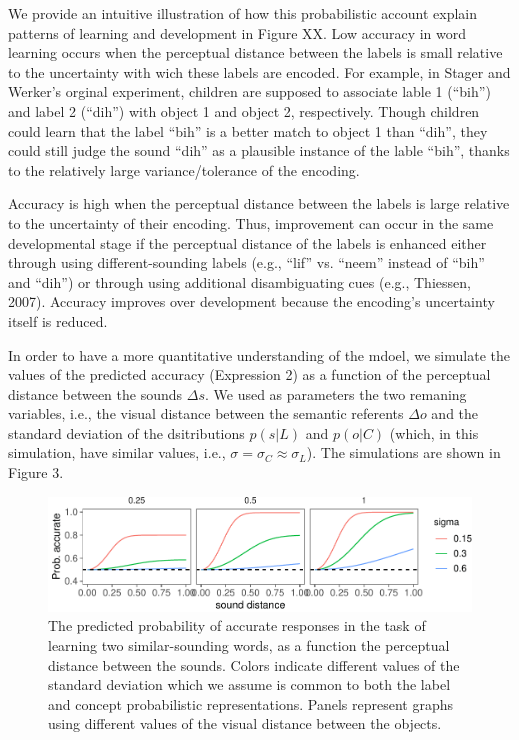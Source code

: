\documentclass[10pt, letterpaper]{article}
\newenvironment{CodeChunk}{}{}
\begin{document}
We provide an intuitive illustration of how this probabilistic account
explain patterns of learning and development in Figure XX. Low accuracy
in word learning occurs when the perceptual distance between the labels
is small relative to the uncertainty with wich these labels are encoded.
For example, in Stager and Werker's orginal experiment, children are
supposed to associate lable 1 (``bih'') and label 2 (``dih'') with
object 1 and object 2, respectively. Though children could learn that
the label ``bih'' is a better match to object 1 than ``dih'', they could
still judge the sound ``dih'' as a plausible instance of the lable
``bih'', thanks to the relatively large variance/tolerance of the
encoding.

Accuracy is high when the perceptual distance between the labels is
large relative to the uncertainty of their encoding. Thus, improvement
can occur in the same developmental stage if the perceptual distance of
the labels is enhanced either through using different-sounding labels
(e.g., ``lif'' vs. ``neem'' instead of ``bih'' and ``dih'') or through
using additional disambiguating cues (e.g., Thiessen, 2007). Accuracy
improves over development because the encoding's uncertainty itself is
reduced.

In order to have a more quantitative understanding of the mdoel, we
simulate the values of the predicted accuracy (Expression 2) as a
function of the perceptual distance between the sounds \(\Delta s\). We
used as parameters the two remaning variables, i.e., the visual distance
between the semantic referents \(\Delta o\) and the standard deviation
of the dsitributions \(p(s| L)\) and \(p(o | C)\) (which, in this
simulation, have similar values, i.e.,
\(\sigma =\sigma_C \approx \sigma_L\)). The simulations are shown in
Figure 3.

\begin{CodeChunk}
\begin{figure}[h]

{\centering \includegraphics{figs/simulation-1} 

}

\caption{\label{fig:simulation}The predicted probability of accurate responses in the task of learning two similar-sounding words, as a function the perceptual distance between the sounds. Colors indicate different values of the standard deviation which we assume is common to both the label and concept probabilistic representations. Panels represent graphs using different values of the visual distance between the objects.}\label{fig:simulation}
\end{figure}
\end{CodeChunk}
\end{document}

